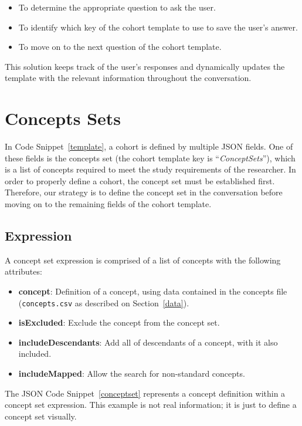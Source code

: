 \begin{itemize}
  \item To determine the appropriate question to ask the user.
  \item To identify which key of the cohort template to use to save the user's answer.
  \item To move on to the next question of the cohort template.
\end{itemize}

This solution keeps track of the user's responses and dynamically updates the template with the relevant information throughout the conversation.


\section{Concepts Sets}

In Code Snippet~\ref{template}, a cohort is defined by multiple JSON fields. One of these fields is the concepts set (the cohort template key is ``\textit{ConceptSets}''), which is a list of concepts required to meet the study requirements of the researcher. In order to properly define a cohort, the concept set must be established first. Therefore, our strategy is to define the concept set in the conversation before moving on to the remaining fields of the cohort template.


\subsection{Expression}
A concept set expression is comprised of a list of concepts with the following attributes:

\begin{itemize}
  \item \textbf{concept}: Definition of a concept, using data contained in the concepts file ({\small\normalfont\texttt{concepts.csv}} as described on Section~\ref{data}).
  \item \textbf{isExcluded}: Exclude the concept from the concept set.
  \item \textbf{includeDescendants}: Add all of descendants of a concept, with it also included.
  \item \textbf{includeMapped}: Allow the search for non-standard concepts.
\end{itemize}


The JSON Code Snippet~\ref{conceptset} represents a concept definition within a concept set expression. This example is not real information; it is just to define a concept set visually.

